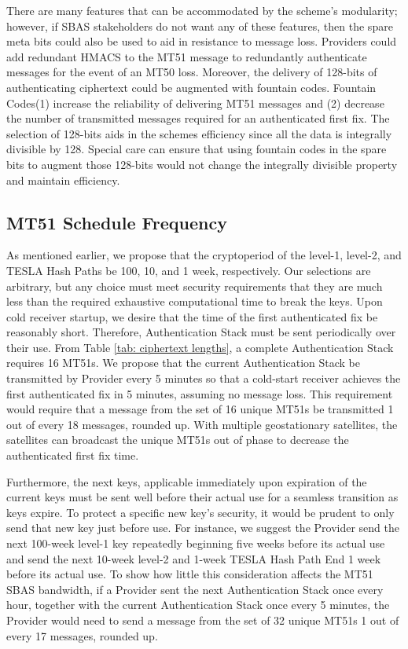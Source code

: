 \documentclass[letterpaper,times]{IONconf/IONconf}
\begin{document}
There are many features that can be accommodated by the scheme's modularity; however, if SBAS stakeholders do not want any of these features, then the spare meta bits could also be used to aid in resistance to message loss.
Providers could add redundant HMACS to the MT51 message to redundantly authenticate messages for the event of an MT50 loss.
Moreover, the delivery of 128-bits of authenticating ciphertext could be augmented with fountain codes.
Fountain Codes(1) increase the reliability of delivering MT51 messages and (2) decrease the number of transmitted messages required for an authenticated first fix.
The selection of 128-bits aids in the schemes efficiency since all the data is integrally divisible by 128.
Special care can ensure that using fountain codes in the spare bits to augment those 128-bits would not change the integrally divisible property and maintain efficiency.

\subsection{MT51 Schedule Frequency} \label{sec: MT51 Freq}

As mentioned earlier, we propose that the cryptoperiod of the level-1, level-2, and TESLA Hash Paths be 100, 10, and 1 week, respectively.
Our selections are arbitrary, but any choice must meet security requirements that they are much less than the required exhaustive computational time to break the keys.
Upon cold receiver startup, we desire that the time of the first authenticated fix be reasonably short.
Therefore, Authentication Stack must be sent periodically over their use.
From Table \ref{tab: ciphertext lengths}, a complete Authentication Stack requires 16 MT51s. 
We propose that the current Authentication Stack be transmitted by Provider every 5 minutes so that a cold-start receiver achieves the first authenticated fix in 5 minutes, assuming no message loss.
This requirement would require that a message from the set of 16 unique MT51s be transmitted 1 out of every 18 messages, rounded up.
With multiple geostationary satellites, the satellites can broadcast the unique MT51s out of phase to decrease the authenticated first fix time.

Furthermore, the next keys, applicable immediately upon expiration of the current keys must be sent well before their actual use for a seamless transition as keys expire.
To protect a specific new key's security, it would be prudent to only send that new key just before use.
For instance, we suggest the Provider send the next 100-week level-1 key repeatedly beginning five weeks before its actual use and send the next 10-week level-2 and 1-week TESLA Hash Path End 1 week before its actual use.
To show how little this consideration affects the MT51 SBAS bandwidth, if a Provider sent the next Authentication Stack once every hour, together with the current Authentication Stack once every 5 minutes, the Provider would need to send a message from the set of 32 unique MT51s 1 out of every 17 messages, rounded up.
\end{document}

